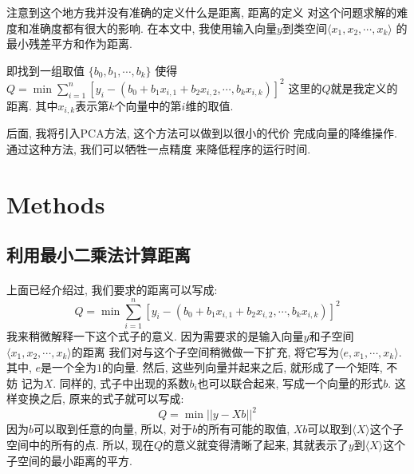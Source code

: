 \documentclass[fleqn,10pt]{SelfArx} %
\begin{document}
		注意到这个地方我并没有准确的定义什么是距离, 距离的定义
		对这个问题求解的难度和准确度都有很大的影响. 
		在本文中, 我使用输入向量$y$到类空间$\langle x_1, x_2, \cdots, x_k \rangle$
		的最小残差平方和作为距离. 
		
		即找到一组取值
		$\{b_0, b_1, \cdots, b_k\}$
		使得$Q = \min\sum_{i=1}^n[y_i - (b_0 + b_1x_{i,1} + b_2x_{i,2}, \cdots, b_kx_{i,k})]^2$
		这里的$Q$就是我定义的距离.
		其中$x_{i,k}$表示第$k$个向量中的第$i$维的取值.

		后面, 我将引入PCA方法, 这个方法可以做到以很小的代价
		完成向量的降维操作. 通过这种方法, 我们可以牺牲一点精度
		来降低程序的运行时间.


\section{Methods}
\subsection{利用最小二乘法计算距离}
	\paragraph{}
		上面已经介绍过, 我们要求的距离可以写成:\\
		\begin{equation}
		Q = \min\sum_{i=1}^n[y_i - (b_0 + b_1x_{i,1} + b_2x_{i,2}, \cdots, b_kx_{i,k})]^2
		\label{eqQ}
		\end{equation}
		我来稍微解释一下这个式子的意义. 
		因为需要求的是输入向量$y$和子空间$\langle x_1, x_2, \cdots, x_k\rangle$的距离
		我们对与这个子空间稍微做一下扩充, 将它写为$\langle e, x_1, \cdots, x_k\rangle$.
		其中, $e$是一个全为$1$的向量. 然后, 这些列向量并起来之后, 就形成了一个矩阵, 不妨
		记为$X$. 同样的, 式子中出现的系数$b_i$也可以联合起来, 写成一个向量的形式$b$.
		这样变换之后, 原来的式子就可以写成:
		\begin{equation}
		Q = \min||y - Xb||^2
		\end{equation}
	   	因为$b$可以取到任意的向量, 所以, 对于$b$的所有可能的取值,
		$Xb$可以取到$\langle X\rangle$这个子空间中的所有的点. 所以, 现在$Q$的意义就变得清晰了起来,
		其就表示了$y$到$\langle X\rangle$这个子空间的最小距离的平方.
\end{document}
